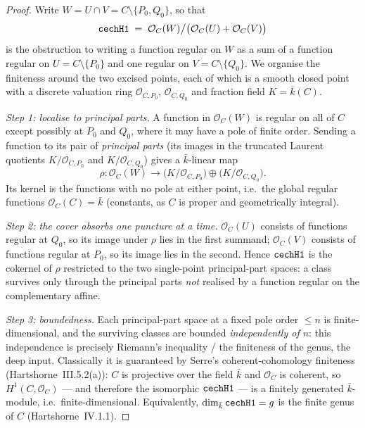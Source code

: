 \begin{proof}
  Write \(W = U \cap V = C \setminus \{P_0, Q_0\}\), so that
  \[
    \mathtt{cechH1} \;=\; \mathcal O_C(W) \big/
      \bigl(\mathcal O_C(U) + \mathcal O_C(V)\bigr)
  \]
  is the obstruction to writing a function regular on \(W\) as a sum of
  a function regular on \(U = C \setminus \{P_0\}\) and one regular on
  \(V = C \setminus \{Q_0\}\). We organise the finiteness around the two
  excised points, each of which is a smooth closed point with a discrete
  valuation ring \(\mathcal O_{C,P_0}\), \(\mathcal O_{C,Q_0}\) and
  fraction field \(K = \bar k(C)\).

  \emph{Step 1: localise to principal parts.} A function in
  \(\mathcal O_C(W)\) is regular on all of \(C\) except possibly at
  \(P_0\) and \(Q_0\), where it may have a pole of finite order. Sending
  a function to its pair of \emph{principal parts} (its images in the
  truncated Laurent quotients \(K / \mathcal O_{C,P_0}\) and
  \(K / \mathcal O_{C,Q_0}\)) gives a \(\bar k\)-linear map
  \[
    \rho \colon \mathcal O_C(W) \longrightarrow
      \bigl(K / \mathcal O_{C,P_0}\bigr) \oplus
      \bigl(K / \mathcal O_{C,Q_0}\bigr).
  \]
  Its kernel is the functions with no pole at either point, i.e.\ the
  global regular functions \(\mathcal O_C(C) = \bar k\) (constants, as
  \(C\) is proper and geometrically integral).

  \emph{Step 2: the cover absorbs one puncture at a time.}
  \(\mathcal O_C(U)\) consists of functions regular at \(Q_0\), so its
  image under \(\rho\) lies in the first summand; \(\mathcal O_C(V)\)
  consists of functions regular at \(P_0\), so its image lies in the
  second. Hence \(\mathtt{cechH1}\) is the cokernel of \(\rho\) restricted to
  the two single-point principal-part spaces: a class survives only
  through the principal parts \emph{not} realised by a function regular
  on the complementary affine.

  \emph{Step 3: boundedness.} Each principal-part space at a fixed pole
  order \(\le n\) is finite-dimensional, and the surviving classes are
  bounded \emph{independently of \(n\)}: this independence is precisely
  Riemann's inequality / the finiteness of the genus, the deep input.
  Classically it is guaranteed by Serre's coherent-cohomology
  finiteness (Hartshorne~III.5.2(a)): \(C\) is projective over the field
  \(\bar k\) and \(\mathcal O_C\) is coherent, so
  \(H^1(C, \mathcal O_C)\) --- and therefore the isomorphic
  \(\mathtt{cechH1}\) --- is a finitely generated \(\bar k\)-module, i.e.\
  finite-dimensional. Equivalently, \(\dim_{\bar k} \mathtt{cechH1} = g\) is the
  finite genus of \(C\) (Hartshorne~IV.1.1).


\end{proof}
